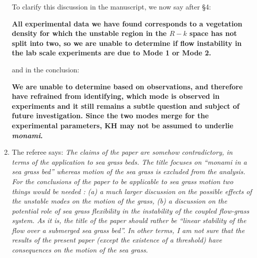 \documentclass[letterpaper,10pt]{article}
\newcommand{\Rey}{{R}}
\newcommand{\monami}{\textit{monami}}
\begin{document}
\begin{enumerate}
To clarify this discussion in the manuscript, we now say after \S 4:

\noindent
\textbf{All experimental data we have found corresponds to a vegetation density for which the unstable region in the $\Rey-k$ space has not split into two, so we are unable to determine if flow instability in the lab scale experiments \citep{Ghisal02} are due to Mode 1 or Mode 2.}

and in the conclusion:

\noindent
\textbf{
We are unable to determine based on observations, and therefore have refrained from identifying, which mode is observed in experiments and it still remains a subtle question and subject of future investigation. Since the two modes merge for the experimental parameters, KH may not be assumed to underlie \monami.
}

\item The referee says:
\textit{
The claims of the paper are somehow contradictory, in terms of the application to sea grass beds. The title focuses on “monami in a sea grass bed” whereas motion of the sea grass is excluded from the analysis.  For the conclusions of the paper to be applicable to sea grass motion two things would be needed : (a) a much larger discussion on the possible effects of the unstable modes on the motion of the grass, (b) a discussion on the potential role of sea grass flexibility in the instability of the coupled flow-grass system. As it is, the  title of the paper should rather  be “linear stability of the flow over a submerged sea grass bed”. In other terms, I am not sure that the results of the present paper (except the existence of a threshold) have consequences on the motion of the sea grass.
}


\end{enumerate}
\end{document}
